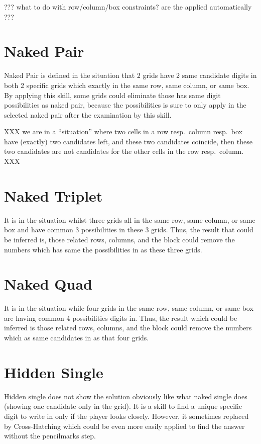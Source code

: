 \documentclass[11pt]{report}
\begin{document}
??? what to do with row/column/box constraints? are the applied automatically ???


\section{Naked Pair}
\label{sec:Naked Pair}

Naked Pair is defined in the situation that 2 grids have 2 same candidate digits in both 2 specific grids which exactly in the same row, same column, or same box. By applying this skill, some grids could eliminate those has same digit possibilities as naked pair, because the possibilities is sure to only apply in the selected naked pair after the examination by this skill.

XXX we are in a ``situation'' where two cells in a row resp.\ column resp.\ box have (exactly) two candidates left, and these two candidates coincide, then these two candidates are not candidates for the other cells in the row resp.\ column. XXX

\section{Naked Triplet}
\label{sec:Naked Triplet}
It is in the situation whilst three grids all in the same row, same column, or same box and have common 3 possibilities in these 3 grids. Thus, the result that could be inferred is, those related rows, columns, and the block could remove the numbers which has same the possibilities in as these three grids.

\section{Naked Quad}
\label{sec:Naked Quad}
It is in the situation while four grids in the same row, same column, or same box are having common 4 possibilities digits in. Thus, the result which could be inferred is those related rows, columns, and the block could remove the numbers which as same candidates in as that four grids.

\section{Hidden Single}
\label{sec:Hidden Single}
Hidden single does not show the solution obviously like what naked single does (showing one candidate only in the grid). It is a skill to find a unique specific digit to write in only if the player looks closely. However, it sometimes replaced by Cross-Hatching which could be even more easily applied to find the answer without the pencilmarks step. 
\end{document}
